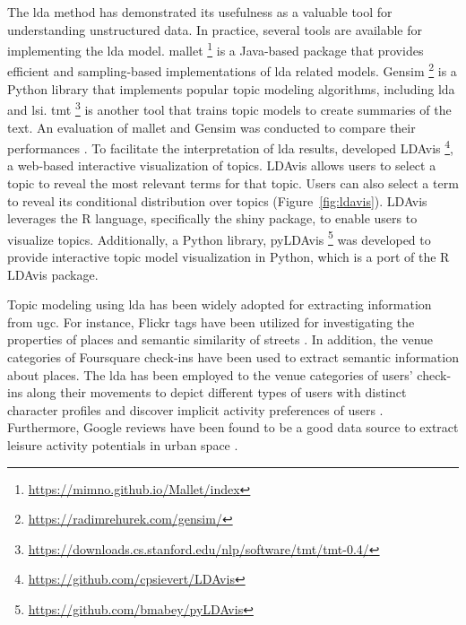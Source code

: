 \documentclass{article}
\theoremstyle{definition}
\theoremstyle{remark}
\begin{document}
The \acrshort{lda} method has demonstrated its usefulness as a valuable tool for understanding unstructured data. In practice, several tools are available for implementing the \acrshort{lda} model. \acrfull{mallet} \footnote{\url{https://mimno.github.io/Mallet/index}} is a Java-based package that provides efficient and sampling-based implementations of \acrshort{lda} related models. Gensim \footnote{\url{https://radimrehurek.com/gensim/}} is a Python library that implements popular topic modeling algorithms, including \acrshort{lda} and \acrshort{lsi}. \acrfull{tmt} \footnote{\url{https://downloads.cs.stanford.edu/nlp/software/tmt/tmt-0.4/}} is another tool that trains topic models to create summaries of the text. An evaluation of \acrshort{mallet} and Gensim was conducted to compare their performances \citep{ebeid_mallet_2016}. To facilitate the interpretation of \acrshort{lda} results, \cite{sievert_ldavis_2014} developed LDAvis \footnote{\url{https://github.com/cpsievert/LDAvis}}, a web-based interactive visualization of topics. LDAvis allows users to select a topic to reveal the most relevant terms for that topic. Users can also select a term to reveal its conditional distribution over topics (Figure~\ref{fig:ldavis}). LDAvis leverages the R language, specifically the shiny package, to enable users to visualize topics. Additionally, a Python library, pyLDAvis \footnote{\url{https://github.com/bmabey/pyLDAvis}} was developed to provide interactive topic model visualization in Python, which is a port of the R LDAvis package.

Topic modeling using \acrshort{lda} has been widely adopted for extracting information from \acrshort{ugc}. For instance, Flickr tags have been utilized for investigating the properties of places and semantic similarity of streets \citep{bahrehdar_description_2018, bahrehdar_streets_2020}. In addition, the venue categories of Foursquare check-ins have been used to extract semantic information about places. The \acrshort{lda} has been employed to the venue categories of users' check-ins along their movements to depict different types of users with distinct character profiles \citep{ferreira_uncovering_2020} and discover implicit activity preferences of users \citep{vu_discovering_2019}. Furthermore, Google reviews have been found to be a good data source to extract leisure activity potentials in urban space \citep{van_weerdenburg_where_2019}.
\end{document}
